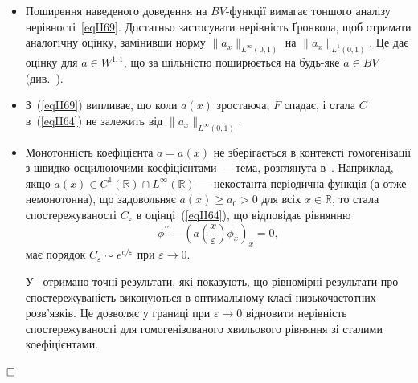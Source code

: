 \begin{remark}
\label{remark:II.2.12}

\begin{itemize}
\item Поширення наведеного доведення на $BV$-функції вимагає тоншого аналізу нерівності~\eqref{eqII69}. Достатньо застосувати нерівність Ґронвола, щоб отримати аналогічну оцінку, замінивши норму $\|a_x\|_{L^\infty(0,1)}$ на $\|a_x\|_{L^1(0,1)}$. Це дає оцінку для $a \in W^{1,1}$, що за щільністю поширюється на будь-яке $a \in BV$ (див.~\cite{fernandez2002zuazua}).

\item З~(\ref{eqII69}) випливає, що коли $a(x)$ зростаюча, $F$ спадає, і стала $C$ в~(\ref{eqII64}) не залежить від $\|a_x\|_{L^\infty(0,1)}$.

\item Монотонність коефіцієнта $a=a(x)$ не зберігається в контексті гомогенізації з швидко осцилюючими коефіцієнтами — тема, розглянута в~\cite{castro2000zuazua, castro2002zuazua}.
Наприклад, якщо $a(x) \in C^1(\mathbb{R}) \cap L^\infty(\mathbb{R})$ — некостанта періодична функція (а отже немонотонна), що задовольняє $a(x) \geq a_0 > 0$ для всіх $x \in \mathbb{R}$, то стала спостережуваності $C_\varepsilon$ в оцінці~(\ref{eqII64}), що відповідає рівнянню
\begin{equation} \label{eqII74}
    \phi^{\prime\prime} - \left(a\left(\frac{x}{\varepsilon}\right) \phi_x\right)_x = 0,
\end{equation}
має порядок $C_\varepsilon \sim e^{c/\varepsilon}$ при $\varepsilon \to 0$.

У~\cite{castro2000zuazua, castro2002zuazua} отримано точні результати, які показують, що рівномірні результати про спостережуваність виконуються в оптимальному класі низькочастотних розв'язків. Це дозволяє у границі при $\varepsilon \to 0$ відновити нерівність спостережуваності для гомогенізованого хвильового рівняння зі сталими коефіцієнтами.
\end{itemize}
$\hfill \square$
\end{remark}

